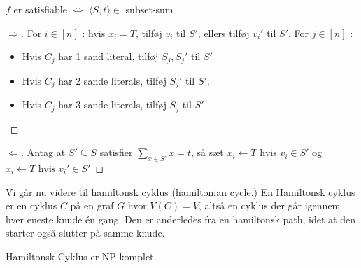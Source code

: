 \begin{claim}
$f$ er satisfiable $\iff$ $\langle S,t\rangle \in $  subset-sum
\end{claim}

\begin{proof}[\(\Rightarrow\)]
  For $i \in [n]$ : hvis $x_{i} = T$, tilføj $v_{i}$ til $S'$, ellers tilføj $v_{i}'$ til $S'$. For $j \in [n]$ :
  \begin{itemize}
    \item Hvis $C_{j}$ har 1 sand literal, tilføj $S_{j}, S_{j}'$ til $S'$
    \item Hvis $C_{j}$ har 2 sande literals, tilføj $S_{j}'$ til $S'$.
    \item Hvis $C_{j}$ har 3 sande literals, tilføj $S_{j}$ til $S'$
  \end{itemize}
\end{proof}

\begin{proof}[\(\Leftarrow\)]
Antag at $S' \subseteq S$ satisfier $\sum_{x \in S'}x = t$, så sæt $x_{i} \leftarrow T \text{ hvis } v_{i} \in S'$ og $x_{i} \leftarrow T \text{ hvis } v_{i}' \in S'$
\end{proof}

Vi går nu videre til hamiltonsk cyklus (hamiltonian cycle.) En Hamiltonsk cyklus er en cyklus $C$ på en graf $G$ hvor $V(C) = V$, altså en cyklus der går igennem hver eneste knude én gang. Den er anderledes fra en hamiltonsk path, idet at den starter også slutter på samme knude.

\begin{theorem}
Hamiltonsk Cyklus er NP-komplet.
\end{theorem}


